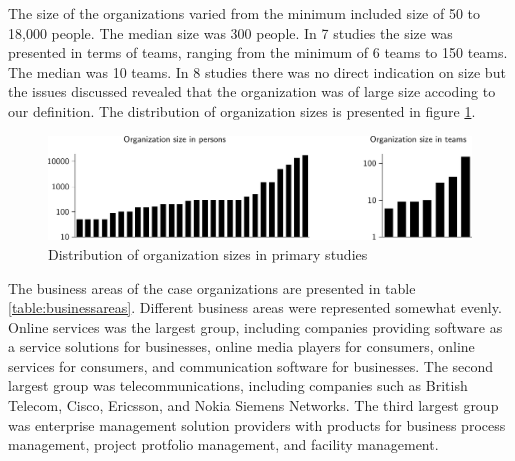 \documentclass[preprint,authoryear,12pt]{elsarticle}
\begin{document}
The size of the organizations varied from the minimum included size of 50 to
18,000 people. The median size was 300 people. In 7 studies the size was
presented in terms of teams, ranging from the minimum of 6 teams to 150 teams.
The median was 10 teams. In 8 studies there was no direct indication on size
but the issues discussed revealed that the organization was of large size
accoding to our definition. The distribution of organization sizes is presented
in figure \ref{fig:organization_size}.

\begin{figure}[b]
  \begin{center}
    \includegraphics[width=1\textwidth]{graphics/organization_size.pdf}
    \caption{Distribution of organization sizes in primary studies}
    \label{fig:organization_size}
  \end{center}
\end{figure}

The business areas of the case organizations are presented in table
\ref{table:businessareas}. Different business areas were represented somewhat
evenly. Online services was the largest group, including companies
providing software as a service solutions for businesses, online media players
for consumers, online services for consumers, and communication software for
businesses. The second largest group was telecommunications, including companies
such as British Telecom, Cisco, Ericsson, and Nokia Siemens Networks. The third
largest group was enterprise management solution providers with products for
business process management, project protfolio management, and facility
management.
\end{document}
